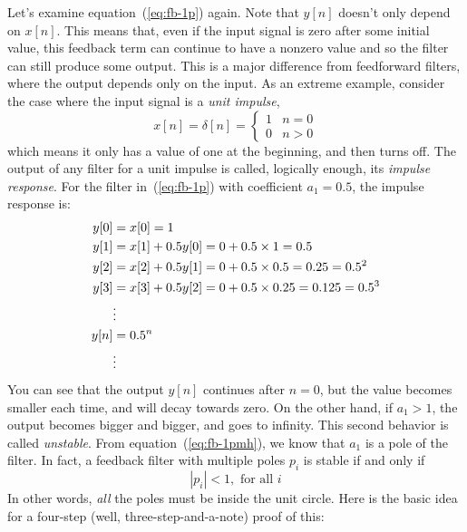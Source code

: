 Let's examine equation~(\ref{eq:fb-1p}) again. Note that $y[n]$
doesn't only depend on $x[n]$. This means that, even if the input
signal is zero after some initial value, this feedback term can
continue to have a nonzero value and so the filter can still produce
some output. This is a major difference from feedforward filters,
where the output depends only on the input. As an extreme example,
consider the case where the input signal is a \emph{unit impulse},
\begin{equation}
x[n] = \delta[n] =
\left\{\begin{array}{rl}
1 & n=0\\
0  & n>0
\end{array}\right.
\end{equation}
which means it only has a value of one at the beginning, and then
turns off.  The output of any filter for a unit impulse is called,
logically enough, its \emph{impulse response}.  For the filter
in~(\ref{eq:fb-1p}) with coefficient $a_1=0.5$, the impulse response
is:
\begin{align}
y[0] &= x[0] = 1 \notag\\
y[1] &= x[1] + 0.5 y[0] = 0+0.5 \times 1 = 0.5 \notag\\
y[2] &= x[2] + 0.5 y[1] = 0+0.5 \times 0.5=0.25=0.5^2 \notag\\
y[3] &= x[3] + 0.5 y[2] = 0+0.5 \times 0.25=0.125=0.5^3 \notag\\
& \vdots  \notag \\
y[n] &= 0.5^n \label{eq:fb-1pexp}\\
& \vdots  \notag
\end{align}
You can see that the output $y[n]$ continues after $n=0$, but the
value becomes smaller each time, and will decay towards zero.  On the
other hand, if $a_1>1$, the output becomes bigger and bigger, and goes
to infinity. This second behavior is called \emph{unstable}.  From
equation~(\ref{eq:fb-1pmh}), we know that $a_1$ is a pole of the
filter.  In fact, a feedback filter with multiple poles $p_i$ is
stable if and only if
\begin{equation}
|p_i| < 1,  \text{ for all } i
\end{equation}
In other words, \emph{all} the poles must be inside the unit
circle. Here is the basic idea for a four-step (well,
three-step-and-a-note) proof of this:

